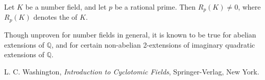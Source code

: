 \documentclass[12pt]{article}
\newcommand{\mb}{\mathbb}
\newcommand{\Q}{\mb{Q}}
\newcommand{\<}{\langle}
\renewcommand{\>}{\rangle}
\begin{document}
Let $K$ be a number field, and let $p$ be a rational prime.  Then $R_p(K)\neq 0$, where $R_p(K)$ denotes the  of $K$.

Though unproven for number fields in general, it is known to be true for abelian extensions of $\Q$, and for certain non-abelian 2-extensions of imaginary quadratic extensions of $\Q$.


\begin{thebibliography}{9}
 L. C. Washington, {\em Introduction to Cyclotomic Fields},
Springer-Verlag, New York.
\end{thebibliography}
\end{document}
